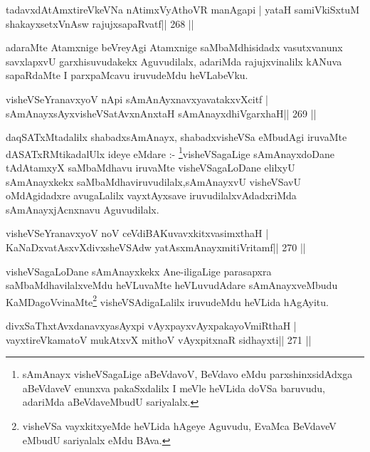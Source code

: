 \begin{shl}
tadavxdAtAmxtireVkeVNa nA\s\s timxVyAthoVR manAgapi |
yataH samiVkiSxtuM shakayxsetxVnAsw rajujxsapaRvatf\hfill || 268 ||
\end{shl}

\begin{artha}
adaraMte Atamxnige beVreyAgi Atamxnige saMbaMdhisidadx vasutxvanunx savxlapxvU garxhisuvudakekx Aguvudilalx, adariMda rajujxvinalilx kANuva sapaRdaMte I parxpaMcavu iruvudeMdu heVLabeVku.
\end{artha}

\begin{shl}
visheVSeYranavxyoV nApi sAmAnAyxnavxyavatakxvXcitf |
sAmAnayxsAyxvisheVSatAvxnAnxtaH sAmAnayxdhiVgarxhaH\hfill || 269 ||
\end{shl}

\begin{artha}
daqSATxMtadalilx shabadxsAmAnayx, shabadxvisheVSa eMbudAgi iruvaMte dASATxRMtikadalUlx ideye eMdare :- \footnote{sAmAnayx visheVSagaLige aBeVdavoV, BeVdavo eMdu parxshinxsidAdxga aBeVdaveV enunxva pakaSxdalilx I meVle heVLida doVSa baruvudu, adariMda aBeVdaveMbudU sariyalalx.}visheVSagaLige sAmAnayxdoDane tAdAtamxyX saMbaMdhavu iruvaMte visheVSagaLoDane elilxyU sAmAnayxkekx saMbaMdhaviruvudilalx,\break sAmAnayxvU visheVSavU oMdAgidadxre avugaLalilx vayxtAyxsave iruvudilalxvAdadxriMda sAmAnayxjAcnxnavu Aguvudilalx.
\end{artha}


\begin{shl}
visheVSeYranavxyoV noV ceVdiBAKuvavxkitxvasimxthaH |
KaNaDxvatAsxvXdivxsheVSAdw yatAsxmAnayxmitiVritamf\hfill || 270 ||
\end{shl}

\begin{artha}
visheVSagaLoDane sAmAnayxkekx Ane-iligaLige parasapxra saMbaMdhavilalxveMdu heVLuvaMte heVLuvudAdare sAmAnayxveMbudu KaMDagoVvinaMte\footnote{visheVSa vayxkitxyeMde heVLida hAgeye Aguvudu, EvaMca BeVdaveV eMbudU sariyalalx eMdu BAva.} visheVSAdigaLalilx iruvudeMdu heVLida hAgAyitu.
\end{artha}


\begin{shl}
divxSaThxtAvxdanavxyasAyxpi vAyxpayxvAyxpakayoVmiRthaH |
vayxtireVkamatoV mukAtxvX mithoV vAyxpitxnaR sidhayxti\hfill || 271 ||
\end{shl}


